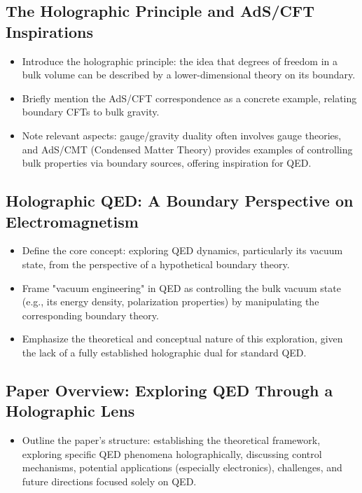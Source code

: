 \documentclass{amsart}
\begin{document}
\subsection{The Holographic Principle and AdS/CFT Inspirations}
\begin{itemize}
    \item Introduce the holographic principle: the idea that degrees of freedom in a bulk volume can be described by a lower-dimensional theory on its boundary.
    \item Briefly mention the AdS/CFT correspondence as a concrete example, relating boundary CFTs to bulk gravity.
    \item Note relevant aspects: gauge/gravity duality often involves gauge theories, and AdS/CMT (Condensed Matter Theory) provides examples of controlling bulk properties via boundary sources, offering inspiration for QED.
\end{itemize}

\subsection{Holographic QED: A Boundary Perspective on Electromagnetism}
\begin{itemize}
    \item Define the core concept: exploring QED dynamics, particularly its vacuum state, from the perspective of a hypothetical boundary theory.
    \item Frame "vacuum engineering" in QED as controlling the bulk vacuum state (e.g., its energy density, polarization properties) by manipulating the corresponding boundary theory.
    \item Emphasize the theoretical and conceptual nature of this exploration, given the lack of a fully established holographic dual for standard QED.
\end{itemize}

\subsection{Paper Overview: Exploring QED Through a Holographic Lens}
\begin{itemize}
    \item Outline the paper's structure: establishing the theoretical framework, exploring specific QED phenomena holographically, discussing control mechanisms, potential applications (especially electronics), challenges, and future directions focused solely on QED.
\end{itemize}
\end{document}
